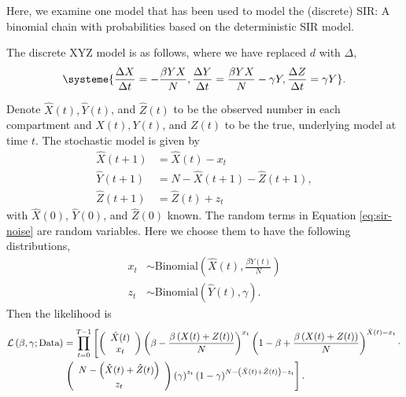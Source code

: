 \documentclass[12pt]{article}
\begin{document}
Here, we examine one model that has been used to model the (discrete) SIR: A binomial chain with probabilities based on the deterministic SIR model.


The discrete XYZ model is as follows, where we have replaced $d$ with $\Delta$,
\begin{align*}
\systeme{\frac{\Delta X}{\Delta t} = -\frac{\beta Y X}{N}, \frac{\Delta Y}{\Delta t} = \frac{\beta Y X}{N} - \gamma Y, \frac{\Delta Z}{\Delta t} = \gamma Y}. 
\end{align*}

Denote $\hat{X}(t), \hat{Y}(t)$, and $\hat{Z}(t)$ to be the observed number in each compartment and $X(t), Y(t)$, and $Z(t)$ to be the true, underlying model at time $t$.   The stochastic model is given by
\begin{align*}
  \hat{X}(t+1) &= \hat{X}(t) - x_t\\
  \hat{Y}(t+1) & = N - \hat{X}(t+1) - \hat{Z}(t+1), \nonumber \\
  \hat{Z}(t+1) &= \hat{Z}(t) + z_t \nonumber
\end{align*}
with $\hat{X}(0)$, $\hat{Y}(0)$, and $\hat{Z}(0)$ known. The random terms in Equation \eqref{eq:sir-noise} are random variables.  Here we choose them to have the following distributions,
\begin{align*}
  x_{t} &\sim \text{Binomial}\left (\hat{X}(t), \frac{\beta Y(t)}{N} \right ) \\
  z_{t} &\sim \text{Binomial}\left (\hat{Y}(t), \gamma \right ). \nonumber
\end{align*}
Then the likelihood is
\begin{align*}
  \mathcal{L}\left (\beta, \gamma ; \textnormal{Data} \right ) &=
                                                  \prod_{t=0}^{T-1} \left [\left ( \begin{array}{c}
                                                            \hat{X}(t) \\
                                                            x_t
                                                            \end{array}
  \right ) \left (\beta - \frac{\beta\left (X(t) +Z(t) \right )}{N} \right )^{x_t} \left (1 - \beta +  \frac{\beta\left (X(t) + Z(t) \right )}{N} \right )^{\hat{X}(t) - x_t} \cdot \right .\\
  & \left . \left ( \begin{array}{c}
              N -\left ( \hat{X}(t) + \hat{Z}(t)\right ) \\
              z_t
            \end{array}
  \right ) \left (\gamma \right )^{z_t} \left ( 1 - \gamma\right )^{N -\left ( \hat{X}(t) + \hat{Z}(t)\right ) - z_t} \right ].
\end{align*}
\end{document}

